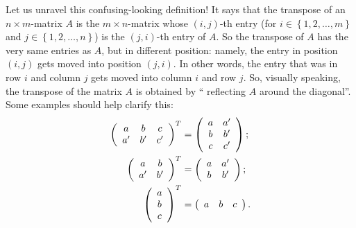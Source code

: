 \documentclass[numbers=enddot,12pt,final,onecolumn,notitlepage]{scrartcl}%
\theoremstyle{definition}
\begin{document}
Let us unravel this confusing-looking definition! It says that the transpose
of an $n\times m$-matrix $A$ is the $m\times n$-matrix whose $\left(
i,j\right)  $-th entry (for $i\in\left\{  1,2,\ldots,m\right\}  $ and
$j\in\left\{  1,2,\ldots,n\right\}  $) is the $\left(  j,i\right)  $-th entry
of $A$. So the transpose of $A$ has the very same entries as $A$, but in
different position: namely, the entry in position $\left(  i,j\right)  $ gets
moved into position $\left(  j,i\right)  $. In other words, the entry that was
in row $i$ and column $j$ gets moved into column $i$ and row $j$. So, visually
speaking, the transpose of the matrix $A$ is obtained by \textquotedblleft
reflecting $A$ around the diagonal\textquotedblright. Some examples should
help clarify this:%
\begin{align*}
\left(
\begin{array}
[c]{ccc}%
a & b & c\\
a^{\prime} & b^{\prime} & c^{\prime}%
\end{array}
\right)  ^{T}  &  =\left(
\begin{array}
[c]{cc}%
a & a^{\prime}\\
b & b^{\prime}\\
c & c^{\prime}%
\end{array}
\right)  ;\\
\left(
\begin{array}
[c]{cc}%
a & b\\
a^{\prime} & b^{\prime}%
\end{array}
\right)  ^{T}  &  =\left(
\begin{array}
[c]{cc}%
a & a^{\prime}\\
b & b^{\prime}%
\end{array}
\right)  ;\\
\left(
\begin{array}
[c]{c}%
a\\
b\\
c
\end{array}
\right)  ^{T}  &  =\left(
\begin{array}
[c]{ccc}%
a & b & c
\end{array}
\right)  .
\end{align*}
\end{document}
